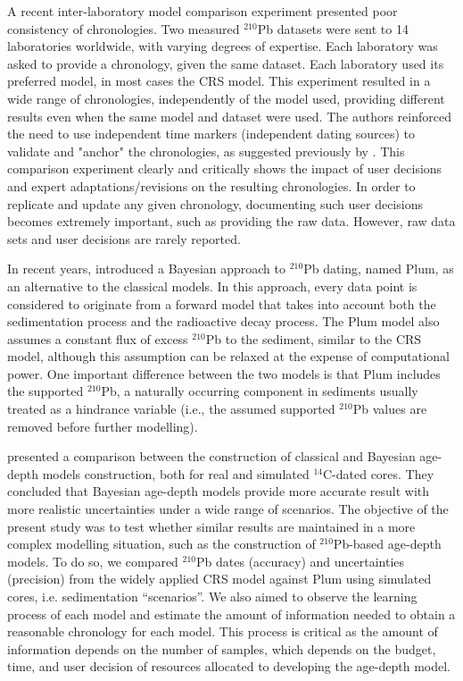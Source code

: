 \documentclass [10pt] {article}
\begin{document}
	A recent inter-laboratory model comparison experiment \citep{Barsanti2020} presented poor consistency of chronologies.
Two measured $^{210}$Pb datasets were sent to 14 laboratories worldwide, with varying degrees of expertise. Each laboratory was asked to provide a chronology, given the same dataset. Each laboratory used its preferred model, in most cases the CRS model. This experiment resulted in a wide range of chronologies, independently of the model used, providing different results even when the same model and dataset were used. The authors reinforced the need to use independent time markers (independent dating sources) to validate and "anchor" the chronologies, as suggested previously by \citet{Smith2001}.  
This comparison experiment clearly and critically shows the impact of user decisions and expert adaptations/revisions on the resulting chronologies. In order to replicate and update any given chronology, documenting such user decisions becomes extremely important, such as providing the raw data. However, raw data sets and user decisions are rarely reported.

In recent years, \citet{Aquino2018} introduced a Bayesian approach to $^{210}$Pb dating, named Plum, as an alternative to the classical models. In this approach, every data point is considered to originate from a forward model that takes into account both the sedimentation process and the radioactive decay process. The Plum model also assumes a constant flux of excess $^{210}$Pb to the sediment, similar to the CRS model, although this assumption can be relaxed at the expense of computational power. One important difference between the two models is that Plum includes the supported $^{210}$Pb, a naturally occurring component in sediments usually treated as a hindrance variable (i.e., the assumed supported $^{210}$Pb values are removed before further modelling).

	\citet{Blaauw2018} presented a comparison between the construction of classical and Bayesian age-depth models construction, both for real and simulated $^{14}$C-dated cores.
They concluded that Bayesian age-depth models provide more accurate result with more realistic uncertainties under a wide range of scenarios.  
The objective of the present study was to test whether similar results are maintained in a more complex modelling situation, such as the construction of $^{210}$Pb-based age-depth models.
To do so, we compared $^{210}$Pb dates (accuracy) and uncertainties (precision) from the widely applied CRS model against Plum using simulated cores, i.e. sedimentation ``scenarios''.
We also aimed to observe the learning process of each model and estimate the amount of information needed to obtain a reasonable chronology for each model.
This process is critical as the amount of information depends on the number of samples, which depends on the budget, time, and user decision of resources allocated to developing the age-depth model.
\end{document}
